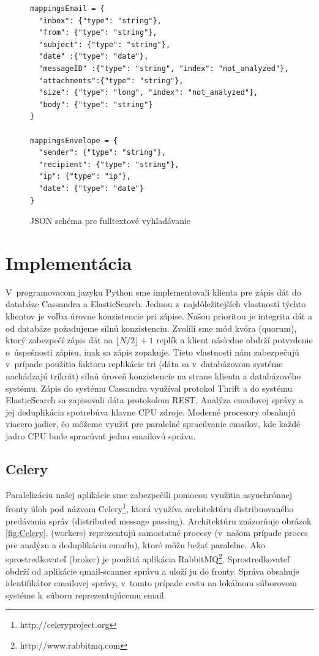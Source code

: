 \documentclass[11pt,twoside,a4paper]{book}
\begin{document}
\begin{figure}[h]
\begin{verbatim}
mappingsEmail = {
  "inbox": {"type": "string"},
  "from": {"type": "string"},
  "subject": {"type": "string"},
  "date" :{"type": "date"},
  "messageID" :{"type": "string", "index": "not_analyzed"},
  "attachments":{"type": "string"},
  "size": {"type": "long", "index": "not_analyzed"},
  "body": {"type": "string"}
}   
            
mappingsEnvelope = {
  "sender": {"type": "string"},
  "recipient": {"type": "string"},
  "ip": {"type": "ip"},
  "date": {"type": "date"}
}     
\end{verbatim}
 \caption{JSON schéma pre fulltextové vyhľadávanie}
 \label{fig:ESschema}
\end{figure}      

\newpage

\section{Implementácia}

V~programovacom jazyku Python sme implementovali klienta pre zápis dát do databáze Cassandra a ElasticSearch. Jednou z~najdôležitejších vlastností týchto klientov je voľba úrovne konzistencie pri zápise. Našou prioritou je integrita dát a od databáze požadujeme silnú konzistenciu. Zvolili sme mód kvóra (quorum), ktorý zabezpečí zápis dát na $\lfloor N/2 \rfloor + 1$ replík a klient následne obdrží potvrdenie o~úspešnosti zápisu, inak sa zápis zopakuje. Tieto vlastnosti nám zabezpečujú v~prípade použitia faktoru replikácie tri (dáta sa v~databázovom systéme nachádzajú trikrát) silnú úroveň konzistencie na strane klienta a databázového systému. Zápis do systému Cassandra využíval protokol Thrift a do systému ElasticSearch sa zapisovali dáta protokolom REST. Analýza emailovej správy a jej deduplikácia spotrebúva hlavne CPU zdroje. Moderné procesory obsahujú viacero jadier, čo môžeme využiť pre paralelné spracúvanie emailov, kde každé jadro CPU bude spracúvať jednu emailovú správu.

\subsection*{Celery}
Paralelizáciu našej aplikácie sme zabezpečili pomocou využitia asynchrónnej fronty úloh pod názvom Celery\footnote{http://celeryproject.org}, ktorá využíva architektúru distribuovaného predávania správ (distributed message passing). Architektúru znázorňuje obrázok \ref{fig:Celery}.  (workers) reprezentujú samostatné procesy (v~našom prípade proces pre analýzu a deduplikáciu emailu), ktoré môžu bežať paralelne. Ako sprostredkovateľ (broker) je použitá aplikácia RabbitMQ\footnote{http://www.rabbitmq.com}. Sprostredkovateľ obdrží od aplikácie qmail-scanner správu a uloží ju do fronty. Správa obsahuje identifikátor emailovej správy, v~tomto prípade cestu na lokálnom súborovom systéme k~súboru reprezentujúcemu email.
\end{document}
